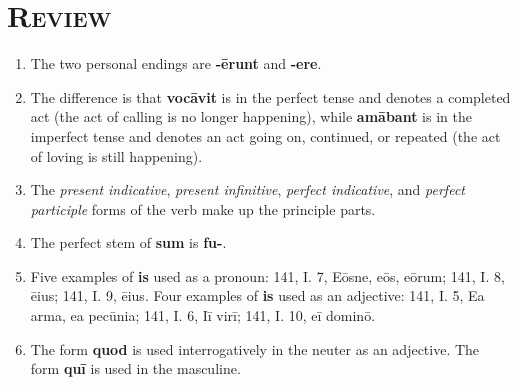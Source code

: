 \documentclass[12pt]{article}
\begin{document}
\section{\textsc{Review}}
\begin{enumerate}[1.]
	\item The two personal endings are \textbf{-ērunt} and \textbf{-ere}.
	\item The difference is that \textbf{vocāvit} is in the perfect tense and denotes a completed act (the act of calling is no longer happening), while \textbf{amābant} is in the imperfect tense and denotes an act going on, continued, or repeated (the act of loving is still happening).
	\item The \textit{present indicative}, \textit{present infinitive}, \textit{perfect indicative}, and \textit{perfect participle} forms of the verb make up the principle parts.
	\item The perfect stem of \textbf{sum} is \textbf{fu-}.
	\item Five examples of \textbf{is} used as a pronoun: 141, I. 7, Eōsne, eōs, eōrum; 141, I. 8, ēius; 141, I. 9, ēius. Four examples of \textbf{is} used as an adjective: 141, I. 5, Ea arma, ea pecūnia; 141, I. 6, Iī virī; 141, I. 10, eī dominō.
	\item The form \textbf{quod} is used interrogatively in the neuter as an adjective. The form \textbf{quī} is used in the masculine.
\end{enumerate}
\end{document}

